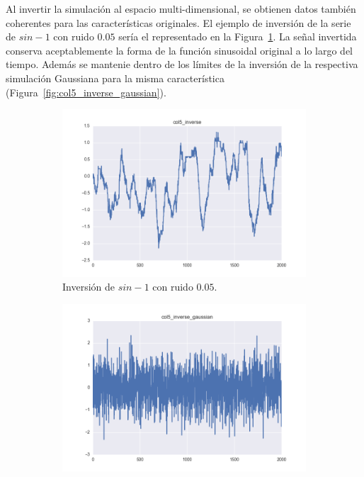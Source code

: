 \documentclass[11pt,spanish,listoffigures,listoftables]{tfgetsinf}
\begin{document}
        Al invertir la simulación al espacio multi-dimensional, se obtienen datos también coherentes para las características originales. El ejemplo de inversión de la serie de \(sin - 1\) con ruido \(0.05\) sería el representado en la Figura~\ref{fig:col5_inverse}. La señal invertida conserva aceptablemente la forma de la función sinusoidal original a lo largo del tiempo. Además se mantenie dentro de los límites de la inversión de la respectiva simulación Gaussiana para la misma característica (Figura~\ref{fig:col5_inverse_gaussian}).

	\begin{figure}[H]
	    \centering
            \begin{subfigure}[h]{0.7\textwidth}
                \centering
                \includegraphics[width=\textwidth]{simulated_data_8_columns/col5_inverse.png}
                \caption{Inversión de \(sin - 1\) con ruido \(0.05\).}
                \label{fig:col5_inverse}
            \end{subfigure}
            \begin{subfigure}[h]{0.7\textwidth}
                \centering
                \includegraphics[width=\textwidth]{simulated_data_8_columns/col5_inverse_gaussian.png}

\end{subfigure}
\end{figure}
\end{document}
